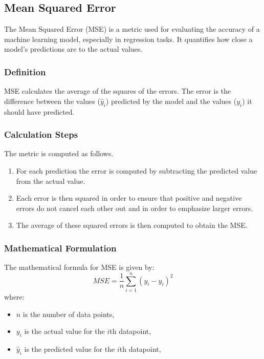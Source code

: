 \subsection{Mean Squared Error}

The Mean Squared Error (MSE) is a metric used for evaluating the accuracy of a machine learning model, especially in regression tasks. It quantifies how close a model's predictions are to the actual values.

\subsubsection{Definition}
MSE calculates the average of the squares of the errors. The error is the difference between the values (\(\hat{y}_i\)) predicted by the model and the values (\(y_i\)) it should have predicted.

\subsubsection{Calculation Steps}
The metric is computed as follows.
\begin{enumerate}
	\item For each prediction the error is computed by subtracting the predicted value from the actual value.
	\item Each error is then squared in order to ensure that positive and negative errors do not cancel each other out and in order to emphasize larger errors.
	\item The average of these squared errors is then computed to obtain the MSE.
\end{enumerate}

\subsubsection{Mathematical Formulation}
The mathematical formula for MSE is given by:
\begin{equation}
	MSE = \frac{1}{n} \sum_{i=1}^{n} (y_i - \hat{y}_i)^2
\end{equation}
where:
\begin{itemize}
	\item \(n\) is the number of data points,
	\item \(y_i\) is the actual value for the \(i\)th datapoint,
	\item \(\hat{y}_i\) is the predicted value for the \(i\)th datapoint,
\end{itemize}

